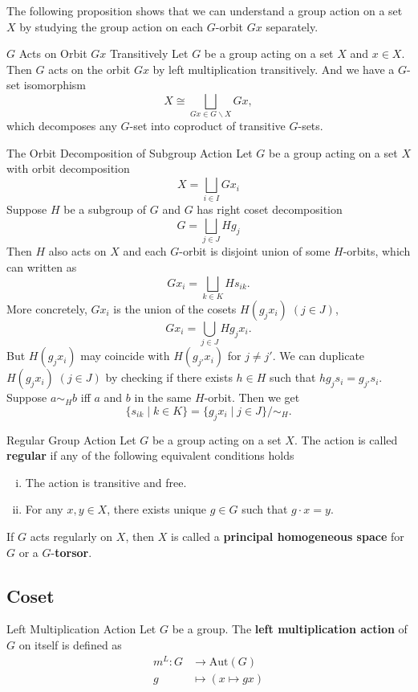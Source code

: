 The following proposition shows that we can understand a group action on a set $X$ by studying the group action on each $G$-orbit $Gx$ separately.

\begin{proposition}{$G$ Acts on Orbit $Gx$ Transitively}{}
    Let $G$ be a group acting on a set $X$ and $x\in X$. Then $G$ acts on the orbit $Gx$ by left multiplication transitively. And we have a $G$-set isomorphism
    \[
        X\cong \bigsqcup_{Gx\in G\backslash X}Gx,
    \]
    which decomposes any $G$-set into coproduct of transitive $G$-sets.
\end{proposition}

\begin{example}{The Orbit Decomposition of Subgroup Action}{}
    Let $G$ be a group acting on a set $X$ with orbit decomposition
    \[
        X=\bigsqcup_{i \in I} G x_i
    \]
    Suppose $H$ be a subgroup of $G$ and $G$ has right coset decomposition
    \[
        G=\bigsqcup_{j \in J} Hg_j
    \]
    Then $H$ also acts on $X$ and each $G$-orbit is disjoint union of some $H$-orbits, which can written as
    \[
        Gx_i =\bigsqcup_{k \in K} H s_{ik}.
    \]
    More concretely, $Gx_i$ is the union of the cosets $H (g_jx_i)\;(j \in J)$,
    \[
        Gx_i =\bigcup_{j \in J} H g_j x_i.
    \]
    But $H (g_{j}x_i)$ may coincide with $H (g_{j'}x_i)$ for $j\ne j'$. We can duplicate $H (g_jx_i)\;(j \in J)$ by checking if there exists $h \in H$ such that $h g_j s_i=g_{j'} s_i$. Suppose $a \sim_H b$ iff $a$ and $b$ in the same $H$-orbit. Then we get
    \[
        \{s_{ik}\mid k \in K\}=\{g_j x_i \mid j \in J\}/\sim_H.
    \]
\end{example}

\begin{definition}{Regular Group Action}{}
    Let $G$ be a group acting on a set $X$. The action is called \textbf{regular} if any of the following equivalent conditions holds
    \begin{enumerate}[(i)]
        \item The action is transitive and free.
        \item For any $x,y\in X$, there exists unique $g\in G$ such that $g\cdot x=y$.
    \end{enumerate}
    If $G$ acts regularly on $X$, then $X$ is called a \textbf{principal homogeneous space} for $G$ or a $G$-\textbf{torsor}.
\end{definition}

\subsection{Coset}
\begin{example}{Left Multiplication Action}{}
    Let $G$ be a group. The \textbf{left multiplication action} of $G$ on itself is defined as
    \begin{align*}
        m^L:G & \longrightarrow \mathrm{Aut}(G) \\
        g     & \longmapsto ( x\longmapsto gx)
    \end{align*}
\end{example}

